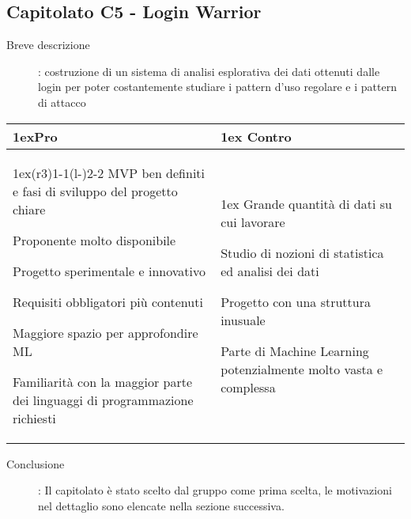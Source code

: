 \subsection*{Capitolato C5 - Login Warrior}
\begin{description}
\item [Breve descrizione]: costruzione di un sistema di analisi esplorativa dei dati ottenuti dalle login per poter costantemente studiare i pattern d’uso regolare e i pattern di attacco
\end{description}
\begin{table}[h]
\begin{tabularx}{\linewidth}{>{\parskip1ex}X@{\kern4\tabcolsep}>{\parskip1ex}X}
\hfil\bfseries Pro
&
\hfil\bfseries Contro
\\\cmidrule(r{3\tabcolsep}){1-1}\cmidrule(l{-\tabcolsep}){2-2}
MVP ben definiti e fasi di sviluppo del progetto chiare \par
Proponente molto disponibile \par
Progetto sperimentale e innovativo \par
Requisiti obbligatori più contenuti \par 
Maggiore spazio per approfondire ML \par
Familiarità con la maggior parte dei linguaggi di programmazione richiesti
&
Grande quantità di dati su cui lavorare \par
Studio di nozioni di statistica ed analisi dei dati \par
Progetto con una struttura inusuale \par
Parte di Machine Learning potenzialmente molto vasta e complessa \\
\end{tabularx}
\end{table}
\begin{description}
	\item [Conclusione]: Il capitolato è stato scelto dal gruppo come prima scelta, le motivazioni nel dettaglio sono elencate nella sezione successiva.
\end{description}


